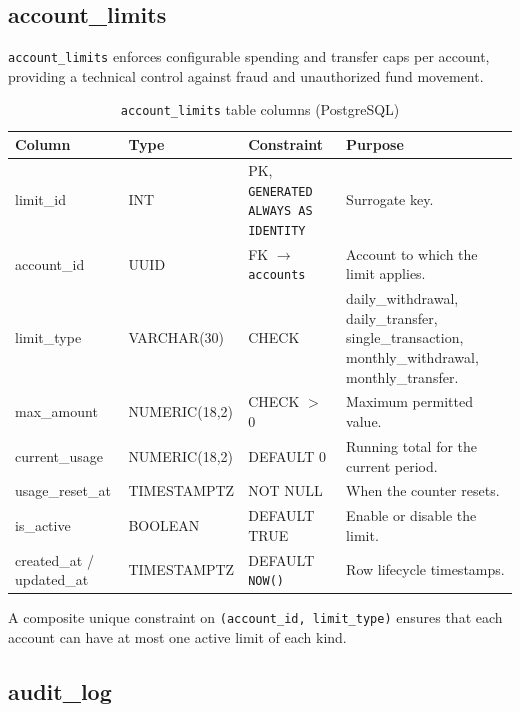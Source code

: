 \subsection{account\_limits}
\label{sec:tbl-limits}

\texttt{account\_limits} enforces configurable spending and transfer caps per account, providing a technical control against fraud and unauthorized fund movement.

\begin{table}[htbp]
  \centering
  \caption{\texttt{account\_limits} table columns (PostgreSQL)}
  \label{tab:limits}
  \small
  \setlength{\tabcolsep}{4pt}
  \renewcommand{\arraystretch}{1.15}
  \begin{tabularx}{\textwidth}{@{} l l l X @{}}
    \toprule
    \textbf{Column} & \textbf{Type} & \textbf{Constraint} & \textbf{Purpose} \\
    \midrule
    limit\_id      & INT             & PK, \texttt{GENERATED ALWAYS AS IDENTITY} & Surrogate key. \\
    account\_id    & UUID            & FK $\to$ \texttt{accounts}     & Account to which the limit applies. \\
    limit\_type    & VARCHAR(30)     & CHECK                 & daily\_withdrawal, daily\_transfer, single\_transaction, monthly\_withdrawal, monthly\_transfer. \\
    max\_amount    & NUMERIC(18,2)   & CHECK $>$ 0           & Maximum permitted value. \\
    current\_usage & NUMERIC(18,2)   & DEFAULT 0             & Running total for the current period. \\
    usage\_reset\_at& TIMESTAMPTZ    & NOT NULL              & When the counter resets. \\
    is\_active     & BOOLEAN         & DEFAULT TRUE          & Enable or disable the limit. \\
    created\_at / updated\_at & TIMESTAMPTZ & DEFAULT \texttt{NOW()} & Row lifecycle timestamps. \\
    \bottomrule
  \end{tabularx}
\end{table}

\noindent A composite unique constraint on \texttt{(account\_id, limit\_type)} ensures that each account can have at most one active limit of each kind.

\subsection{audit\_log}
\label{sec:tbl-audit}

